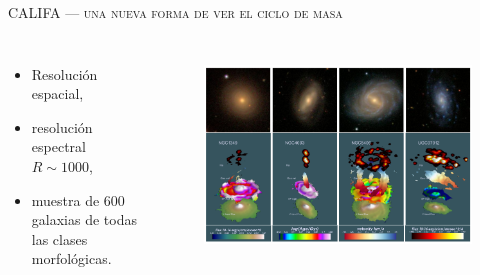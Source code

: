 \documentclass[xcolor=dvipsnames,4pt,fleqn,hyperref={colorlinks,citecolor=black,linkcolor=black,urlcolor=black}]{beamer}
\begin{document}
\begin{frame}{\textsc{CALIFA --- una nueva forma de ver el ciclo de masa}}

\begin{columns}
\begin{itemize}
\setlength\itemsep{0.5em}
\item Resolución espacial,
\item resolución espectral $R\sim1000$,
\item muestra de $600$ galaxias de todas las clases morfológicas.
\end{itemize}

\begin{figure}
\flushright\citep{Sanchez2012,Husemann2013}
\includegraphics[scale=0.6]{img/husemann2013-20}
\end{figure}
\end{columns}
%
\end{frame}
\end{document}
